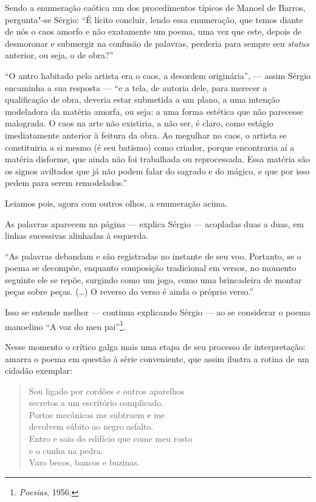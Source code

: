 {Sendo a enumeração caótica um dos procedimentos típicos de Manoel de
Barros, pergunta"-se Sérgio: ``É lícito concluir, lendo essa enumeração,
que temos diante de nós o caos amorfo e não exatamente um poema, uma vez
que este, depois de desmoronar e submergir na confusão de palavras,
perderia para sempre seu \emph{status} anterior, ou seja, o de
obra?''

``O antro habitado pelo artista era o caos, a desordem originária'', ---
assim Sérgio encaminha a sua resposta --- ``e a tela, de autoria dele,
para merecer a qualificação de obra, deveria estar submetida a um plano,
a uma intenção modeladora da matéria amorfa, ou seja: a uma forma
estética que não parecesse malograda. O caos na arte não existiria, a
não ser, é claro, como estágio imediatamente anterior à feitura da obra.
Ao megulhar no caos, o artista se constituiria a si mesmo (é seu
batismo) como criador, porque encontraria aí a matéria disforme, que
ainda não foi trabalhada ou reprocessada. Essa matéria são os signos
aviltados que já não podem falar do sagrado e do mágico, e que por isso
pedem para serem remodelados.''

Leiamos pois, agora com outros olhos, a enumeração acima.

As palavras aparecem na página --- explica Sérgio --- acopladas duas a duas, em linhas sucessivas alinhadas à
esquerda.

``As palavras debandam e são registradas no instante de seu voo.
Portanto, se o poema se decompõe, enquanto composição tradicional em
versos, no momento seguinte ele se repõe, surgindo como um jogo, como
uma brincadeira de montar peças sobre peças. (\ldots{}) O reverso do verso é
ainda o próprio verso.''

Isso se entende melhor --- continua explicando Sérgio --- ao se considerar
o poema manoelino ``A voz do meu pai''\footnote{\emph{Poesias}, 1956.}.

Nesse momento o crítico galga mais uma etapa de seu processo de
interpretação: amarra o poema em questão à série conveniente, que assim
ilustra a rotina de um cidadão exemplar:

\begin{verse}
Sou ligado por cordões e outros aparelhos \\
secretos a um escritório complicado. \\[5pt]
Portas mecânicas me subtraem e me \\
devolvem súbito ao negro asfalto. \\[5pt]
Entro e saio do edifício que come meu rosto \\
e o cunha na pedra. \\[5pt]
Varo becos, bancos e buzinas.
\end{verse}

}
